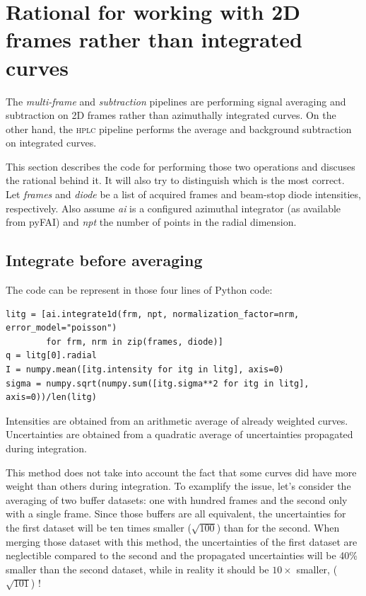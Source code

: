 \documentclass[preprint]{iucr}              %
\begin{document}
\section{Rational for working with 2D frames rather than integrated curves}
\label{rational}
The \textit{multi-frame} and \textit{subtraction} pipelines are performing signal averaging and subtraction on 2D frames rather than azimuthally integrated curves.
On the other hand, the \textsc{hplc} pipeline performs the average and background subtraction on integrated curves.

This section describes the code for performing those two operations and discuses the rational behind it.
It will also try to distinguish which is the most correct. 
Let \textit{frames} and \textit{diode} be a list of acquired frames and beam-stop diode intensities, respectively.
Also assume \textit{ai} is a configured azimuthal integrator (as available from pyFAI) and \textit{npt} the number of points in the radial dimension.

\subsection{Integrate before averaging}
The code can be represent in those four lines of Python code:
\begin{verbatim} 
litg = [ai.integrate1d(frm, npt, normalization_factor=nrm, error_model="poisson") 
        for frm, nrm in zip(frames, diode)]
q = litg[0].radial
I = numpy.mean([itg.intensity for itg in litg], axis=0)
sigma = numpy.sqrt(numpy.sum([itg.sigma**2 for itg in litg], axis=0))/len(litg)
\end{verbatim}

Intensities are obtained from an arithmetic average of already weighted curves.
Uncertainties are obtained from a quadratic average of uncertainties propagated during integration. 

This method does not take into account the fact that some curves did have more weight than others during integration.
To examplify the issue, let's consider the averaging of two buffer datasets: one with hundred frames and the second only with a single frame.
Since those buffers are all equivalent, the uncertainties for the first dataset will be ten times smaller ($\sqrt{100}$) than for the second.
When merging those dataset with this method, the uncertainties of the first dataset are neglectible compared to the second and the propagated uncertainties will be 40\% smaller than the second dataset, while in reality it should be $10\times$ smaller, ($\sqrt{101}$) ! 
\end{document}
